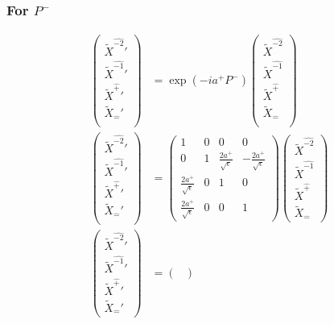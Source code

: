 \documentclass[]{article}
\numberwithin{equation}{section}
\begin{document}
{{\subsubsection{For $P^{-}$}
\begin{align}
\begin{pmatrix}
    \tilde{X}^{\hat{-2}}'\\
    \tilde{X}^{\hat{-1}}'\\
    \tilde{X}^{\hat{+}}'\\
    \tilde{X}_{\hat{-}}'\\
    \end{pmatrix}&= \exp{\left(-ia^{+}P^{-}\right)}\begin{pmatrix}
    \tilde{X}^{\hat{-2}}\\
    \tilde{X}^{\hat{-1}}\\
    \tilde{X}^{\hat{+}}\\
    \tilde{X}_{\hat{-}}\\
    \end{pmatrix}\\
    \begin{pmatrix}
    \tilde{X}^{\hat{-2}}'\\
    \tilde{X}^{\hat{-1}}'\\
    \tilde{X}^{\hat{+}}'\\
    \tilde{X}_{\hat{-}}'\\
    \end{pmatrix}&= \begin{pmatrix}
        1&0&0&0\\
        0&1&\frac{2a^{+}}{\sqrt{\epsilon}}&-\frac{2a^{+}}{\sqrt{\epsilon}}\\
        \frac{2a^{+}}{\sqrt{\epsilon}}&0&1&0\\
        \frac{2a^{+}}{\sqrt{\epsilon}}&0&0&1
    \end{pmatrix}\begin{pmatrix}
    \tilde{X}^{\hat{-2}}\\
    \tilde{X}^{\hat{-1}}\\
    \tilde{X}^{\hat{+}}\\
    \tilde{X}_{\hat{-}}
    \end{pmatrix}\\
    \begin{pmatrix}
    \tilde{X}^{\hat{-2}}'\\
    \tilde{X}^{\hat{-1}}'\\
    \tilde{X}^{\hat{+}}'\\
    \tilde{X}_{\hat{-}}'
    \end{pmatrix}&= \begin{pmatrix}

\end{pmatrix}
\end{align}}}
\end{document}
